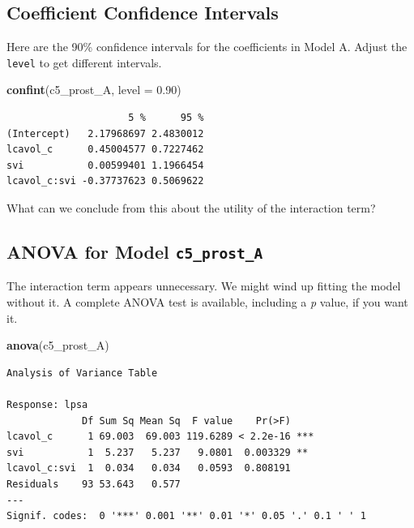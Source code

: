 \documentclass[]{book}
\newenvironment{Shaded}{\begin{snugshade}}{\end{snugshade}}
\newcommand{\KeywordTok}[1]{\textcolor[rgb]{0.13,0.29,0.53}{\textbf{#1}}}
\newcommand{\DataTypeTok}[1]{\textcolor[rgb]{0.13,0.29,0.53}{#1}}
\newcommand{\FloatTok}[1]{\textcolor[rgb]{0.00,0.00,0.81}{#1}}
\newcommand{\NormalTok}[1]{#1}
\theoremstyle{definition}
\theoremstyle{definition}
\theoremstyle{definition}
\theoremstyle{remark}
\begin{document}
\subsection{Coefficient Confidence
Intervals}\label{coefficient-confidence-intervals}

Here are the 90\% confidence intervals for the coefficients in Model A.
Adjust the \texttt{level} to get different intervals.

\begin{Shaded}
\begin{Highlighting}[]
\KeywordTok{confint}\NormalTok{(c5_prost_A, }\DataTypeTok{level =} \FloatTok{0.90}\NormalTok{)}
\end{Highlighting}
\end{Shaded}

\begin{verbatim}
                     5 %      95 %
(Intercept)   2.17968697 2.4830012
lcavol_c      0.45004577 0.7227462
svi           0.00599401 1.1966454
lcavol_c:svi -0.37737623 0.5069622
\end{verbatim}

What can we conclude from this about the utility of the interaction
term?

\subsection{\texorpdfstring{ANOVA for Model
\texttt{c5\_prost\_A}}{ANOVA for Model c5\_prost\_A}}\label{anova-for-model-c5_prost_a}

The interaction term appears unnecessary. We might wind up fitting the
model without it. A complete ANOVA test is available, including a
\emph{p} value, if you want it.

\begin{Shaded}
\begin{Highlighting}[]
\KeywordTok{anova}\NormalTok{(c5_prost_A)}
\end{Highlighting}
\end{Shaded}

\begin{verbatim}
Analysis of Variance Table

Response: lpsa
             Df Sum Sq Mean Sq  F value    Pr(>F)    
lcavol_c      1 69.003  69.003 119.6289 < 2.2e-16 ***
svi           1  5.237   5.237   9.0801  0.003329 ** 
lcavol_c:svi  1  0.034   0.034   0.0593  0.808191    
Residuals    93 53.643   0.577                       
---
Signif. codes:  0 '***' 0.001 '**' 0.01 '*' 0.05 '.' 0.1 ' ' 1
\end{verbatim}
\end{document}
